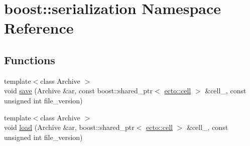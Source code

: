 \hypertarget{namespaceboost_1_1serialization}{\section{boost\-:\-:serialization Namespace Reference}
\label{namespaceboost_1_1serialization}
}
\subsection*{Functions}
\begin{DoxyCompactItemize}
\item 
{\footnotesize template$<$class Archive $>$ }\\void \hyperlink{namespaceboost_1_1serialization_a2426e0778002bc8706de04819006b274}{save} (Archive \&ar, const boost\-::shared\-\_\-ptr$<$ \hyperlink{structecto_1_1cell}{ecto\-::cell} $>$ \&cell\-\_\-, const unsigned int file\-\_\-version)
\item 
{\footnotesize template$<$class Archive $>$ }\\void \hyperlink{namespaceboost_1_1serialization_a05438bec420c8465b28eab17e1e1dc16}{load} (Archive \&ar, boost\-::shared\-\_\-ptr$<$ \hyperlink{structecto_1_1cell}{ecto\-::cell} $>$ \&cell\-\_\-, const unsigned int file\-\_\-version)
\end{DoxyCompactItemize}


